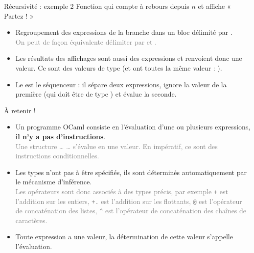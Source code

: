\documentclass[10pt]{beamer}
\begin{document}
\begin{frame}{\Ctitle}{\stitle}
	\begin{exampleblock}{Récursivité : exemple 2}
		Fonction qui compte à rebours depuis $n$ et affiche « Partez ! »
		\begin{itemize}
			\item<2-> Regroupement des expressions de la branche  dans un bloc délimité par \kw{(} \kw{)}. \\
				\textcolor{gray}{On peut de façon équivalente délimiter par  et .}
			\item<3-> Les résultats des affichages sont aussi des expressions et renvoient donc une valeur. Ce sont des valeurs de type  (et ont toutes la même valeur : \kw{()}).
			\item<4-> Le \kw{;} est le séquenceur : il sépare deux expressions, ignore la valeur de la première (qui doit être de type ) et évalue la seconde.
		\end{itemize}
	\end{exampleblock}
\end{frame}

\begin{frame}{\Ctitle}{\stitle}
	\begin{block}{\textcolor{yellow}{\danger} À retenir !}
		\begin{itemize}
			\item<1-> Un programme OCaml consiste en l'évaluation d'une ou plusieurs expressions, \textbf{il n'y a pas d'instructions}.\\
				\onslide<2->\textcolor{gray}{Une structure  \dots {} \dots {} s'évalue en une valeur. En impératif, ce sont des instructions conditionnelles.}
			\item<3-> Les types n'ont pas à être spécifiés, ils sont déterminés automatiquement par le mécanisme d'inférence.\\
			\onslide<3->\textcolor{gray}{Les opérateurs sont donc associés à des types précis, par exemple {\tt +} est l'addition sur les entiers, {\tt +.} est l'addition sur les flottants, \texttt{@} est l'opérateur de concaténation des listes, \texttt{^} est l'opérateur de concaténation des chaînes de caractères.}
			\item<4-> Toute expression a une valeur, la détermination de cette valeur s'appelle l'évaluation.
		\end{itemize}
	\end{block}
\end{frame}
\end{document}
